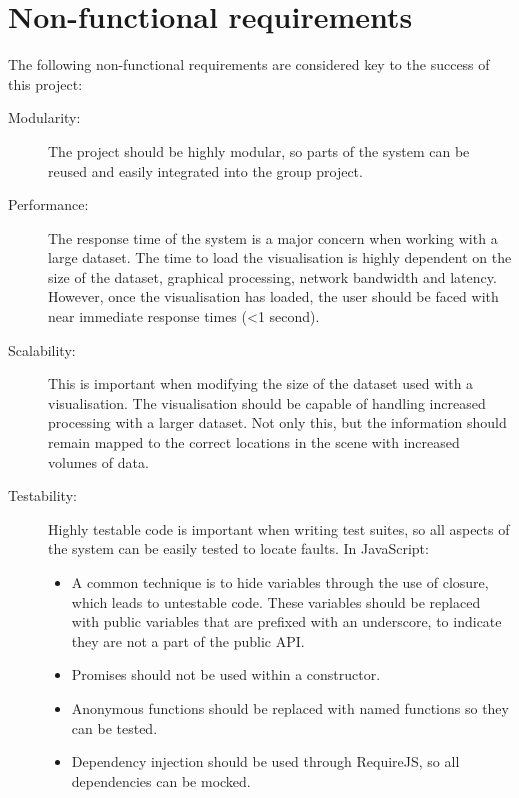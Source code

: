 
\section{Non-functional requirements} {
\label{sec:non_functiona_requirements}

	The following non-functional requirements are considered key to the success of this project:

	\begin{description}
		\item[Modularity:] The project should be highly modular, so parts of the system can be reused and easily integrated into the group project.
		\item[Performance:] The response time of the system is a major concern when working with a large dataset. The time to load the visualisation is highly dependent on the size of the dataset, graphical processing, network bandwidth and latency. However, once the visualisation has loaded, the user should be faced with near immediate response times (\textless 1 second).
		\item[Scalability:] This is important when modifying the size of the dataset used with a visualisation. The visualisation should be capable of handling increased processing with a larger dataset. Not only this, but the information should remain mapped to the correct locations in the scene with increased volumes of data.
		\item[Testability:] Highly testable code is important when writing test suites, so all aspects of the system can be easily tested to locate faults. In JavaScript:
			\begin{itemize}
				\item A common technique is to hide variables through the use of closure, which leads to untestable code. These variables should be replaced with public variables that are prefixed with an underscore, to indicate they are not a part of the public API.
				\item Promises should not be used within a constructor.
				\item Anonymous functions should be replaced with named functions so they can be tested.
				\item Dependency injection should be used through RequireJS, so all dependencies can be mocked.
			\end{itemize}
	\end{description}

}

